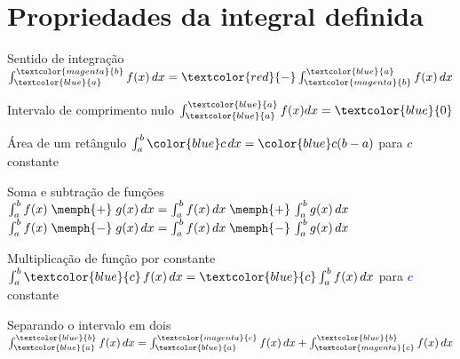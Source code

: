 \documentclass[fleqn,utf8,aspectratio=169,12pt]{beamer}
\begin{document}
\section{Propriedades da integral definida}

\begin{frame}{Sentido de integração}
  \large
  \(
    \int_{\textcolor{blue}{a}}^{\textcolor{magenta}{b}} f(x)\,dx
    = \textcolor{red}{-}
    \int^{\textcolor{blue}{a}}_{\textcolor{magenta}{b}} f(x)\,dx
  \)
\end{frame}

\begin{frame}{Intervalo de comprimento nulo}
  \large
  \(
    \int_{\textcolor{blue}{a}}^{\textcolor{blue}{a}\vphantom{b}} f(x)dx
    = \textcolor{blue}{0}
  \)
\end{frame}

\begin{frame}{Área de um retângulo}{}
  \large
  \(
    \int_{a}^b {\color{blue}c}\,dx = {\color{blue}c}(b-a)
  \)
  \qquad\qquad
  para {\color{blue}$c$} constante
\end{frame}

\begin{frame}{Soma e subtração de funções}
  \large
  \(
    \int_{a}^b f(x) \;\memph{+}\; g(x)\, dx =
    \int_{a}^b f(x)\,dx \;\memph{+}\,
    \int_{a}^b g(x)\,dx
  \)
  \\[7mm]
  \(
    \int_{a}^b f(x) \;\memph{-}\; g(x)\, dx =
    \int_{a}^b f(x)\,dx \;\memph{-}\,
    \int_{a}^b g(x)\,dx
  \)
\end{frame}

\begin{frame}{Multiplicação de função por constante}{}
  \large
  \(
        \int_{a}^b \textcolor{blue}{c}\,f(x)\,dx
      = \textcolor{blue}{c} \int_{a}^b f(x)\,dx
  \)
  \qquad\qquad
  para \textcolor{blue}{$c$} constante
\end{frame}

\begin{frame}{Separando o intervalo em dois}{}
  \large
  \(
    \int_{\textcolor{blue}{a}}^{\textcolor{blue}{b}} f(x)\,dx
    = \int_{\textcolor{blue}{a}}^{\textcolor{magenta}{c}} f(x)\,dx
    + \int_{\textcolor{magenta}{c}}^{\textcolor{blue}{b}} f(x)\,dx
  \)
\end{frame}
\end{document}
